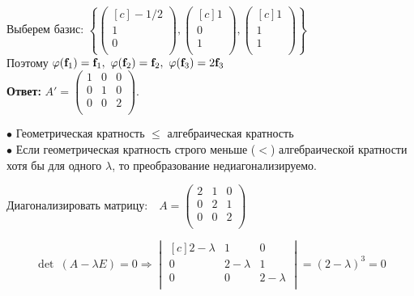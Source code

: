 Выберем базис: $\left\{
\left(
\begin{smallmatrix*}[c]
-1/2\\ 1\\ 0\\
\end{smallmatrix*}
\right) 
,
\left(
\begin{smallmatrix*}[c]
1\\ 0\\ 1\\
\end{smallmatrix*}
\right) 
,
\left(
\begin{smallmatrix*}[c]
1\\ 1\\ 1\\
\end{smallmatrix*}
\right) 
\right\}$\\

Поэтому $\varphi(\textbf{f$_1$})=\textbf{f$_1$},~\varphi(\textbf{f$_2$})=\textbf{f$_2$},~\varphi(\textbf{\textbf{f$_3$}})=2\textbf{f$_3$}$\\ %

\textbf{Ответ:} $A'=\begin{pmatrix}
1 & 0 & 0\\
0 & 1 & 0\\
0 & 0 & 2\\
\end{pmatrix}.$

\bigskip

$\bullet$ Геометрическая кратность $\le$ алгебраическая кратность\\

$\bullet$ Если геометрическая кратность строго меньше ($<$) алгебраической кратности хотя бы для одного $\lambda$, то преобразование \textsf{недиагонализируемо}.

\begin{prim}
	Диагонализировать матрицу:~~$A=\begin{pmatrix}
	2 & 1 & 0\\
	0 & 2 & 1\\
	0 & 0 & 2\\
	\end{pmatrix}$\\
\end{prim}

$$
\det~(A - \lambda E) = 0 \Rightarrow
\begin{vmatrix*}[c]
2-\lambda & 1 & 0\\
0 & 2-\lambda  & 1\\
0 & 0  & 2-\lambda\\
\end{vmatrix*}
= (2-\lambda)^3= 0 $$

